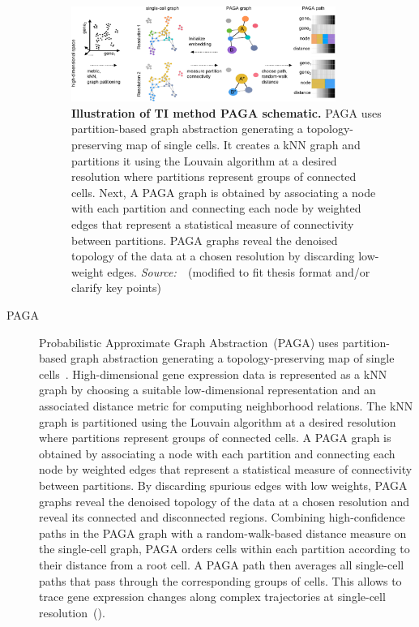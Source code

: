 \begin{description}
\begin{figure}[h!]
  	\centering
  	\includegraphics[width=0.85\textwidth]{TI_Alg_PAGA/fig}
  	\vspace{0.1cm}
  	\caption[Illustration of TI method PAGA schematic.]{\textbf{Illustration of TI method PAGA schematic.}
  	PAGA uses partition-based graph abstraction generating a topology-preserving map of single cells. It creates a kNN graph and partitions it using the Louvain algorithm at a desired resolution where partitions represent groups of connected cells. Next, A PAGA graph is obtained by associating a node with each partition and connecting each node by weighted edges that represent a statistical measure of connectivity between partitions. PAGA graphs reveal the denoised topology of the data at a chosen resolution by discarding low-weight edges. \emph{Source:~\cite{wolf2019paga}}~(modified to fit thesis format and/or clarify key points)
  	}
  	\label{fig:TI_Alg_PAGA}
\end{figure}

  \item[PAGA]
  Probabilistic Approximate Graph Abstraction~(PAGA) uses partition-based graph abstraction generating a topology-preserving map of single cells~\citep{wolf2019paga}. High-dimensional gene expression data is represented as a kNN graph by choosing a suitable low-dimensional representation and an associated distance metric for computing neighborhood relations. The kNN graph is partitioned using the Louvain algorithm at a desired resolution where partitions represent groups of connected cells. A PAGA graph is obtained by associating a node with each partition and connecting each node by weighted edges that represent a statistical measure of connectivity between partitions. By discarding spurious edges with low weights, PAGA graphs reveal the denoised topology of the data at a chosen resolution and reveal its connected and disconnected regions. Combining high-confidence paths in the PAGA graph with a random-walk-based distance measure on the single-cell graph, PAGA orders cells within each partition according to their distance from a root cell. A PAGA path then averages all single-cell paths that pass through the corresponding groups of cells. This allows to trace gene expression changes along complex trajectories at single-cell resolution~().


\end{description}
